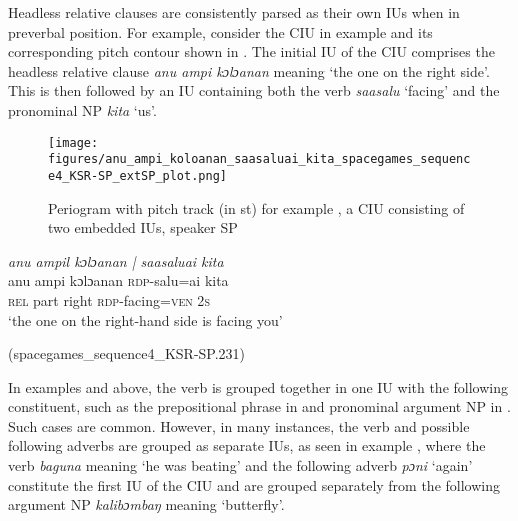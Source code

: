 Headless relative clauses are consistently parsed as their own IUs when in preverbal position. For example, consider the CIU in example   and its corresponding pitch contour shown in  . The initial IU of the CIU comprises the headless relative clause \textit{anu ampi kɔlɔanan} meaning ‘the one on the right side’.  This is then followed by an IU containing both the verb \textit{saasalu} ‘facing’ and the pronominal NP \textit{kita} ‘us’.

\begin{figure}
	\texttt{[image: figures/anu\_ampi\_koloanan\_saasaluai\_kita\_spacegames\_sequence4\_KSR-SP\_extSP\_plot.png]}
	\caption{Periogram with pitch track (in st) for example , a CIU consisting of two embedded IUs, speaker SP}
	\label{pitch:anu ampi koloanan saasaluai kita}
\end{figure}

\newpage

\ea
\label{ex:anu ampi koloanan saasaluai kita1}
\textit{anu ampil kɔlɔanan | saasaluai kita} \\
\gll anu ampi kɔlɔanan \textsc{rdp}-salu=ai kita  \\
\textsc{rel} part right \textsc{rdp}-facing=\textsc{ven} 2\textsc{s}\\ 
\glt ‘the one on the right-hand side is facing you’ \begin{flushright}(spacegames\_sequence4\_KSR-SP.231)
	\end{flushright}
\z




In examples  and  above, the verb is grouped together in one IU with the following constituent, such as the prepositional phrase in  and pronominal argument NP in  . Such cases are common. However, in many instances, the verb and possible following adverbs are grouped as separate IUs, as seen in example , where the verb \textit{bagu{\ü}na}  meaning `he was beating' and the following adverb \textit{pɔni} `again'  constitute the first IU of the CIU and are grouped separately from the following argument NP \textit{kalibɔmbaŋ} meaning `butterfly'.

